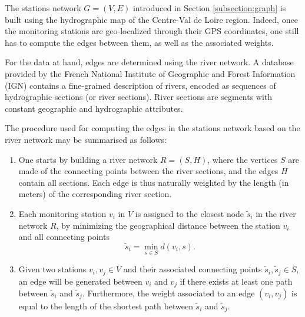 The stations network $G=(V,E)$ introduced in Section \ref{subsection:graph} is built using the hydrographic map of the Centre-Val de Loire region. Indeed, once the monitoring stations are geo-localized through their GPS coordinates, one still has to compute the edges between them, as well as the associated weights. 

For the data at hand, edges are determined using the river network. A database provided by the French National Institute of Geographic and Forest Information (IGN) \cite{IGN:BD:TOPO} contains a fine-grained description of rivers, encoded as sequences of hydrographic sections (or river sections). River sections are segments with constant geographic and hydrographic attributes. 

The procedure used for computing the edges in the stations network based on the river network may be summarised as follows:



\begin{enumerate}
    \item One starts by building a river network $R=(S,H)$, where the vertices $S$ are made of the connecting points between the river sections, and the edges $H$ contain all sections. Each edge is thus naturally weighted by the length (in meters) of the corresponding river section. 
    \item Each monitoring station $v_i$ in $V$ is assigned to the closest node $\tilde s_i$ in the river network $R$, by minimizing the geographical distance between the station $v_i$ and all connecting points
    \begin{equation*}
     \tilde s_i=\min_{s\in S} d(v_i, s).
    \end{equation*}
    \item Given two stations $v_i,v_j \in V$ and their associated connecting points $\tilde s_i,\tilde s_j \in S$, an edge will be generated between $v_i$ and $v_j$ if there exists at least one path between $\tilde s_i$ and $\tilde s_j$. Furthermore, the weight associated to an edge $(v_i,v_j)$ is equal to the length of the shortest path between $\tilde s_i$ and $\tilde s_j$.
\end{enumerate}

